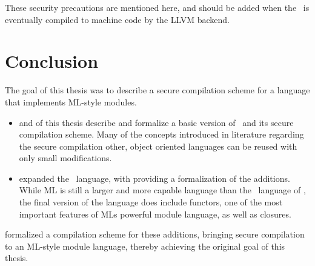 \begin{itemize}
These security precautions are mentioned here, and should be added when the \LLVMIR\ is eventually compiled to machine code by the LLVM backend.
\end{itemize}


\section{Conclusion}
\label{sec:Conclusion}
The goal of this thesis was to describe a secure compilation scheme for a language that implements ML-style modules.
\begin{itemize}
\item
{} and  of this thesis describe and formalize a basic version of \MiniML\ and its secure compilation scheme.
Many of the concepts introduced in literature regarding the secure compilation other, object oriented languages can be reused with only small modifications.

\item
{} expanded the \MiniML\ language, with  providing a formalization of the additions.
While ML is  still a larger and more capable language than the \MiniML\ language of , the final version of the language does include functors, one of the most important features of MLs powerful module language, as well as closures.
\end{itemize}

 formalized a compilation scheme for these additions, bringing secure compilation to an ML-style module language, thereby achieving the original goal of this thesis. 
